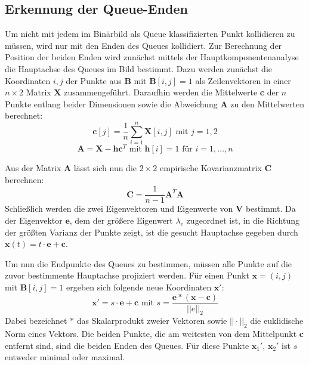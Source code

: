 \subsection{Erkennung der Queue-Enden}
Um nicht mit jedem im Binärbild als Queue klassifizierten Punkt kollidieren zu müssen, wird nur mit den Enden des Queues kollidiert.
Zur Berechnung der Position der beiden Enden wird zunächst mittels der Hauptkomponentenanalyse die Hauptachse des Queues im Bild bestimmt. 
Dazu werden zunächst die Koordinaten $i, j$ der Punkte aus $\textbf{B}$ mit $\textbf{B}[i,j] = 1$ als Zeilenvektoren in einer $n \times 2$ Matrix $\textbf{X}$ zusammengeführt.
Daraufhin werden die Mittelwerte \textbf{c} der $n$ Punkte entlang beider Dimensionen sowie die Abweichung $\textbf{A}$ zu den Mittelwerten berechnet:
\begin{equation*}
\textbf{c}[j] = \frac{1}{n}\sum_{i=1}^{n}\textbf{X}[i, j]\text{ mit }j = 1, 2
\end{equation*}
\begin{equation*}
\textbf{A} = \textbf{X} - \textbf{h}\textbf{c}^T \text{ mit } \textbf{h}[i] = 1 \text{ für } i=1,\dots,n
\end{equation*}

Aus der Matrix \textbf{A} lässt sich nun die $2 \times 2$ empirische Kovarianzmatrix $\textbf{C}$ berechnen:
\begin{equation*}
	\textbf{C} = \frac{1}{n-1}\textbf{A}^{T}\textbf{A}
\end{equation*}
Schließlich werden die zwei Eigenvektoren und Eigenwerte von $\textbf{V}$ bestimmt. 
Da der Eigenvektor $\textbf{e}$, dem der größere Eigenwert $\lambda_e$ zugeordnet ist, in die Richtung der größten Varianz der Punkte zeigt, ist die gesucht Hauptachse gegeben durch $\textbf{x}(t) = t \cdot \textbf{e} + \textbf{c}$.

Um nun die Endpunkte des Queues zu bestimmen, müssen alle Punkte auf die zuvor bestimmente Hauptachse projiziert werden.
Für einen Punkt $\textbf{x} = (i, j)$ mit $\textbf{B}[i,j] = 1$ ergeben sich folgende neue Koordinaten $\textbf{x}'$:
\begin{equation*}
	\textbf{x}' = s \cdot \textbf{e} + \textbf{c}\text{ mit } s = \frac{\textbf{e} * (\textbf{x} - \textbf{c})}{||e||_2}
\end{equation*}
Dabei bezeichnet $*$ das Skalarprodukt zweier Vektoren sowie $||\cdot||_2$ die euklidische Norm eines Vektors.
Die beiden Punkte, die am weitesten von dem Mittelpunkt \textbf{c} entfernt sind, sind die beiden Enden des Queues. Für diese Punkte $\textbf{x}_1'$, $\textbf{x}_2'$ ist $s$ entweder minimal oder maximal. 

